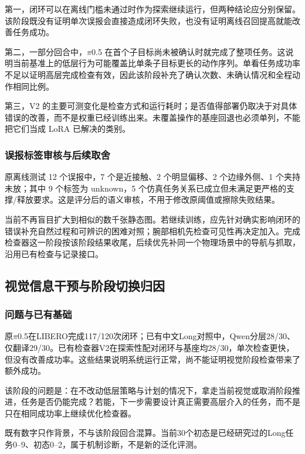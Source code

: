 第一，闭环可以在离线门槛未通过时作为探索继续运行，但两种结论应分别保留。该阶段既没有证明单次误报会直接造成闭环失败，也没有证明离线召回提高就能改善任务成功。

第二，一部分回合中，\(\pi\)0.5 在首个子目标尚未被确认时就完成了整项任务。这说明当前基准上的低层行为可能覆盖比单条子目标更长的动作序列。单看任务成功率不足以证明高层完成检查有效，因此该阶段补充了确认次数、未确认情况和全程动作相同比例。

第三，V2 的主要可测变化是检查方式和运行耗时；是否值得部署仍取决于对具体错误的改善，而不是权重已经训练出来。未覆盖操作的基座回退也必须单列，不能把它们当成 LoRA 已解决的类别。

\subsubsection{误报标签审核与后续取舍}\label{s12-detail-6}

原离线测试 12 个误报中，7 个是近接触、2 个明显偏移、2 个边缘外侧、1 个夹持未放；其中 9 个标签为 unknown，5 个仿真任务关系已成立但未满足更严格的支撑/释放要求。这是评分后的语义审核，不用于修改原阈值或擦除失败结果。

当前不再盲目扩大到相似的数千张静态图。若继续训练，应先针对确实影响闭环的错误补充自然过程和可辨识的困难对照；腕部相机先检查可见性再决定加入。完成检查器这一阶段按该阶段结果收尾，后续优先补同一个物理场景中的导航与抓取，沿用已有检查与记录接口。


\subsection{视觉信息干预与阶段切换归因}\label{s12-detail-7}

\subsubsection{问题与已有基础}\label{s12-detail-8}

原\(\pi\)0.5在LIBERO完成117/120次闭环；已有中文Long对照中，Qwen分层28/30、仅翻译29/30。已有检查器V2在探索性配对闭环与基座均28/30，单次检查更快，但没有改善成功率。这些结果说明系统运行正常，尚不能证明视觉阶段检查带来了额外成功。

该阶段的问题是：在不改动低层策略与计划的情况下，拿走当前视觉或取消阶段推进，任务是否仍能完成？若能，下一步需要设计真正需要高层介入的任务，而不是只在相同成功率上继续优化检查器。

既有数字只作背景，不与该阶段回合混算。当前30个初态是已经研究过的Long任务0--9、初态0--2，属于机制诊断，不是新的泛化评测。

